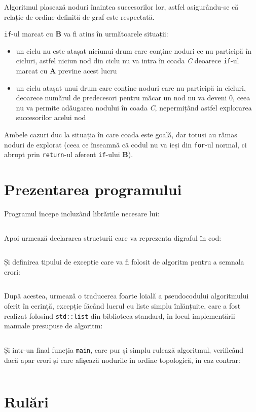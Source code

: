 \documentclass{article}
\newcommand{\code}[2]{\inputminted[linenos, breaklines, firstline=#1, lastline=#2]{c++}{Tema1.cpp}}
\begin{document}
    Algoritmul plasează noduri înaintea succesorilor lor, astfel asigurându-se că relație de ordine
    definită de graf este respectată.

    \texttt{if}-ul marcat cu \textbf{B} va fi atins în următoarele situații:
    \begin{itemize}
        \item un ciclu nu este atașat niciunui drum care conține noduri ce nu participă în cicluri,
        astfel niciun nod din ciclu nu va intra în coada \emph{C} deoarece \texttt{if}-ul marcat cu
        \textbf{A} previne acest lucru
        \item un ciclu atașat unui drum care conține noduri care nu participă in cicluri, deoarece
        numărul de predecesori pentru măcar un nod nu va deveni 0, ceea nu va permite adăugarea
        nodului în coada \emph{C}, nepermițând astfel explorarea succesorilor acelui nod
    \end{itemize}

    Ambele cazuri duc la situația în care coada este goală, dar totuși au rămas noduri de explorat
    (ceea ce înseamnă că codul nu va ieși din \texttt{for}-ul normal, ci abrupt prin \texttt{return}-ul
    aferent \texttt{if}-ului \textbf{B}).

    \section{Prezentarea programului}

    Programul începe incluzând librăriile necesare lui:
    \code{1}{5}

    Apoi urmează declararea structurii care va reprezenta digraful în cod:
    \code{7}{21}

    Și definirea tipului de excepție care va fi folosit de algoritm pentru a semnala erori:
    \code{23}{28}

    După acestea, urmează o traducerea foarte loială a pseudocodului algoritmului oferit în cerință,
    excepție făcând lucrul cu liste simplu înlănțuite, care a fost realizat folosind \texttt{std::list}
    din biblioteca standard, în locul implementării manuale presupuse de algoritm:
    \code{30}{66}

    Și intr-un final funcția \texttt{main}, care pur și simplu rulează algoritmul, verificând dacă
    apar erori și care afișează nodurile în ordine topologică, în caz contrar:
    \code{68}{96}

    \section{Rulări}
\end{document}
